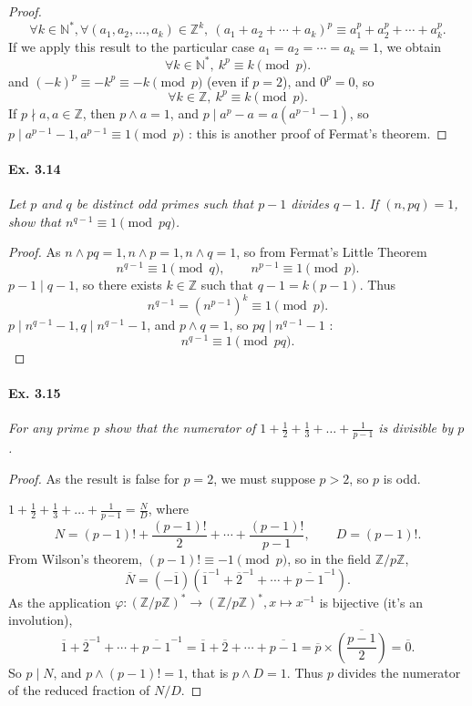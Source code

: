 \documentclass[11pt,a4paper]{article}
\newcommand{\Z}{\mathbb{Z}}
\newcommand{\N}{\mathbb{N}}
\begin{document}
{\begin{proof}
$$\forall k \in \N^*, \forall (a_1,a_2,\ldots,a_k) \in \Z^k,\  (a_1+a_2+\cdots+a_k)^p \equiv a_1^p+a_2^p+\cdots+a_k^p.$$
If we apply this result to the particular case $a_1=a_2=\cdots = a_k = 1$, we obtain
$$\forall k \in \N^*,\ k^p \equiv k \pmod p.$$
and $(-k)^p \equiv - k^p \equiv -k \pmod p$ (even if $p=2$), and $0^p =0$, so
$$\forall k \in \Z,\ k^p \equiv k \pmod p.$$
If $p \nmid a, a \in \Z$, then $p\wedge a = 1$, and $p \mid a^p-a = a(a^{p-1} - 1)$, so $p \mid a^{p-1} - 1, a^{p-1} \equiv 1 \pmod p$ : this is another proof of Fermat's theorem.
\end{proof}

\paragraph{Ex. 3.14}

{\it Let $p$ and $q$ be distinct odd primes such that $p - 1$ divides $q -1$. If $(n, pq) = 1$, show that $n^{q - 1} \equiv 1 \pmod {pq}$.
}

\begin{proof}
As $n \wedge pq = 1, n\wedge p=1, n \wedge q = 1$, so from Fermat's Little Theorem
$$n^{q-1} \equiv 1 \pmod q,\qquad n^{p-1} \equiv 1 \pmod p.$$
$p-1 \mid q-1$, so there exists $k \in \Z$ such that $q-1 = k(p-1)$.
Thus
$$n^{q-1} = (n^{p-1})^k \equiv 1 \pmod p.$$
$p \mid n^{q-1} - 1, q \mid n^{q-1} - 1$, and $p\wedge q = 1$, so $pq \mid n^{q-1} - 1$ :
$$n^{q-1} \equiv 1 \pmod{pq}.$$
\end{proof}

\paragraph{Ex. 3.15}

{\it For any prime $p$ show that the numerator of $1+ \frac{1}{2} + \frac{1}{3} + \ldots + \frac{1}{p-1}$ is divisible by $p$.
}

\begin{proof}
As the result is false for $p=2$, we must suppose $p>2$, so $p$ is odd.

$1+ \frac{1}{2} + \frac{1}{3} + \ldots + \frac{1}{p-1} = \frac{N}{D}$, where
$$ N = (p-1)! + \frac{(p-1)!}{2}+ \cdots+\frac{(p-1)!}{p-1}, \qquad D= (p-1)!.$$
From Wilson's theorem, $(p-1)! \equiv -1 \pmod p$, so in the field $\Z/p\Z$,
$$ \overline{N} = (-\overline{1})(\overline{1}^{-1} + \overline{2}^{-1}+\cdots+\overline{p-1}^{-1}).$$
As the application $\varphi : (\Z/p\Z)^* \to (\Z/p\Z)^*, x \mapsto x^{-1}$ is bijective (it's an involution), 
$$\overline{1} + \overline{2}^{-1}+\cdots+\overline{p-1}^{-1} = \overline{1} + \overline{2}+\cdots+\overline{p-1} = \overline{p} \times \overline{\left(  \frac{p-1}{2}\right)} = \overline{0}.$$
So $p \mid N $, and $p \wedge (p-1)! = 1$, that is $p\wedge D = 1$. Thus $p$ divides the numerator of the reduced fraction of $N/D$.
\end{proof}

}
\end{document}
